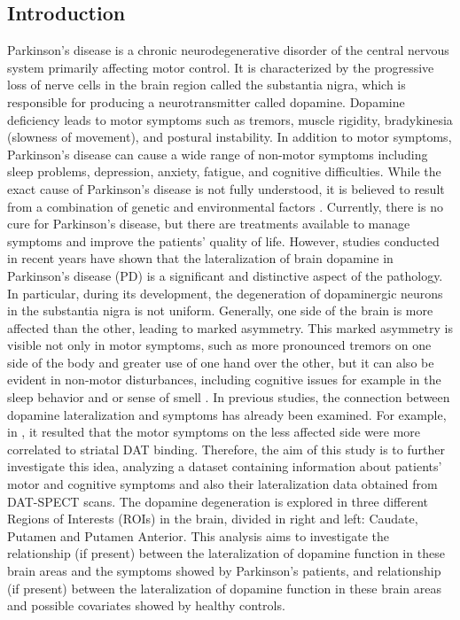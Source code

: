 \documentclass[]{article}
\begin{document}
\begin{multicols}{2}
\section{Introduction}
Parkinson's disease is a chronic neurodegenerative disorder of the central nervous system primarily affecting motor control. It is characterized by the progressive loss of nerve cells in the brain region called the substantia nigra, which is responsible for producing a neurotransmitter called dopamine. Dopamine deficiency leads to motor symptoms such as tremors, muscle rigidity, bradykinesia (slowness of movement), and postural instability. In addition to motor symptoms, Parkinson's disease can cause a wide range of non-motor symptoms including sleep problems, depression, anxiety, fatigue, and cognitive difficulties. While the exact cause of Parkinson's disease is not fully understood, it is believed to result from a combination of genetic and environmental factors \cite{beitz_parkinsons_2014}. Currently, there is no cure for Parkinson's disease, but there are treatments available to manage symptoms and improve the patients’ quality of life.  However, studies conducted in recent years have shown that the lateralization of brain dopamine in Parkinson's disease (PD) is a significant and distinctive aspect of the pathology. In particular, during its development, the degeneration of dopaminergic neurons in the substantia nigra is not uniform. Generally, one side of the brain is more affected than the other, leading to marked asymmetry. This marked asymmetry is visible not only in motor symptoms, such as more pronounced tremors on one side of the body and greater use of one hand over the other, but it can also be evident in non-motor disturbances, including cognitive issues for example in the sleep behavior and or sense of smell \cite{riederer_lateralisation_2018}. 
\newline
In previous studies, the connection between dopamine lateralization and symptoms has already been examined. For example, in \cite{pirker_correlation_2003}, it resulted that the motor symptoms on the less affected side were more correlated to striatal DAT binding.
\newline
Therefore, the aim of this study is to further investigate this idea, analyzing a dataset containing information about patients' motor and cognitive symptoms and also their lateralization data obtained from DAT-SPECT scans. The dopamine degeneration is explored in three different Regions of Interests (ROIs) in the brain, divided in right and left: Caudate, Putamen and Putamen Anterior. This analysis aims to investigate the relationship (if present) between the lateralization of dopamine function in these brain areas and the symptoms showed by Parkinson's patients, and relationship (if present) between the lateralization of dopamine function in these brain areas and possible covariates showed by healthy controls.

\end{multicols}
\end{document}
